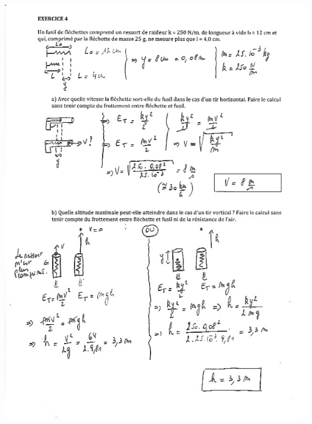 \includegraphics[width=15cm]{COURS2EnergieOHEXERCRESOL-img/COURS2EnergieOHEXERCRESOL-img012.png} 

